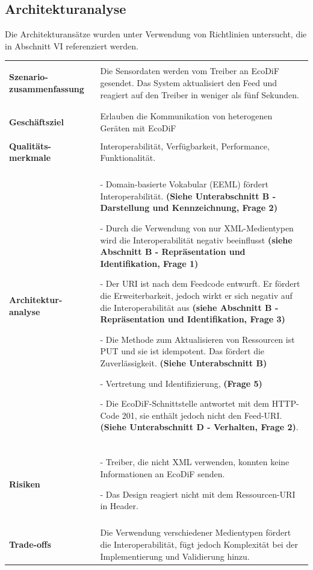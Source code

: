\documentclass{acmsiggraph}
\begin{document}
\subsection{Architekturanalyse}
Die Architekturansätze wurden unter Verwendung von Richtlinien untersucht, die in Abschnitt VI referenziert werden.
\vspace{4px}
\begin{center}
  \label{tab:xtab}
  \begin{xtabular}{|C{2,5cm}|L{5,5cm}|} 
  \hline
  & \\[-2ex]
    \textbf{Szenario-zusammenfassung} & 
Die Sensordaten werden vom Treiber an EcoDiF gesendet. Das System aktualisiert den Feed und reagiert auf den Treiber in weniger als fünf Sekunden. \\
    & \\[-2ex]
  \hline
  & \\[-2ex]
    \textbf{Geschäftsziel} & Erlauben die Kommunikation von heterogenen Geräten mit EcoDiF \\
    \hline
    & \\[-2ex]
   \textbf{ Qualitäts-merkmale} & Interoperabilität, Verfügbarkeit, Performance, Funktionalität.
 \\ 
     \hline
       & \\[-2ex]
    \textbf{Architektur-analyse} & 
\item[-] Domain-basierte Vokabular (EEML) fördert Interoperabilität. \textbf{(Siehe Unterabschnitt B - Darstellung und Kennzeichnung, Frage 2)}
\item[-] Durch die Verwendung von nur XML-Medientypen wird die Interoperabilität negativ beeinflusst \textbf{(siehe Abschnitt B - Repräsentation und Identifikation, Frage 1)}
\item[-] Der URI ist nach dem Feedcode entwurft. Er fördert die Erweiterbarkeit, jedoch wirkt er sich negativ auf die Interoperabilität aus \textbf{(siehe Abschnitt B - Repräsentation und Identifikation, Frage 3)}
\item[-] Die Methode zum Aktualisieren von Ressourcen ist PUT und sie ist idempotent. Das fördert die Zuverlässigkeit. \textbf{(Siehe Unterabschnitt B)}
\item[-] Vertretung und Identifizierung, \textbf{(Frage 5)}
\item[-] Die EcoDiF-Schnittstelle antwortet mit dem HTTP-Code 201, sie enthält jedoch nicht den Feed-URI. \textbf{(Siehe Unterabschnitt D - Verhalten, Frage 2)}.
 \\ 
     \hline 
     & \\[-2ex]
   \textbf{Risiken} & 
\item[-] Treiber, die nicht XML verwenden, konnten keine Informationen an EcoDiF senden.
\item[-] Das Design reagiert nicht mit dem Ressourcen-URI in Header.
 \\ 
       \hline 
      & \\[-2ex]
     \textbf{Trade-offs} & 
     Die Verwendung verschiedener Medientypen fördert die Interoperabilität, fügt jedoch Komplexität bei der Implementierung und Validierung hinzu.
\\    
\hline 
 \end{xtabular}
 \end{center}
\end{document}

